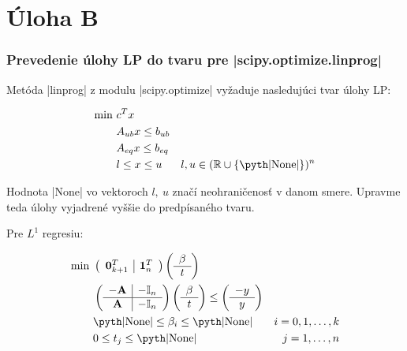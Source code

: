 \documentclass[12pt,oneside,a4paper,slovak]{article}
\begin{document}
   

\section*{Úloha B}


\subsubsection*{Prevedenie úlohy LP do tvaru pre \pyth|scipy.optimize.linprog|}

Metóda \pyth|linprog| z modulu \pyth|scipy.optimize| vyžaduje nasledujúci tvar úlohy LP:

\begin{align*}
	\text{min}~ &c^Tx\\
	&A_{ub}x \leq b_{ub} \\
	&A_{eq}x \leq b_{eq} \\
	&l \leq x \leq u & l,u \in (\mathbb{R}\cup \{\text{\pyth|None|\}})^n 
\end{align*}

Hodnota \pyth|None| vo vektoroch $l,~u$ značí neohraničenosť v danom smere. Upravme teda úlohy vyjadrené vyššie do predpísaného tvaru.

Pre $L^1$ regresiu:

\begin{align*}
	\text{min}~ &
	\left(
	\begin{array}{c|c}
		\mathbf{0}_{k+1}^T & \mathbf{1}_n^T
	\end{array}
	\right)
	\left(
	\begin{array}{c}
		\beta \\
		\hline
		t
	\end{array}
	\right) \\
	&\left(
	\begin{array}{c|c}
		-\mathbf{A} & -\mathbb{I}_n \\
		\hline
		\mathbf{A} & -\mathbb{I}_n
	\end{array}
	\right)
	\left(
	\begin{array}{c}
		\beta \\
		\hline
		t
	\end{array}
	\right)
	\leq
	\left(
	\begin{array}{c}
		-y \\
		\hline
		y
	\end{array}
	\right) \\
	&\text{\pyth|None|} \leq \beta_i \leq \text{\pyth|None|} &i = 0,1,\dots,k\\
	&0 \leq t_j \leq \text{\pyth|None|} &j = 1,\dots,n
\end{align*}
\end{document}
